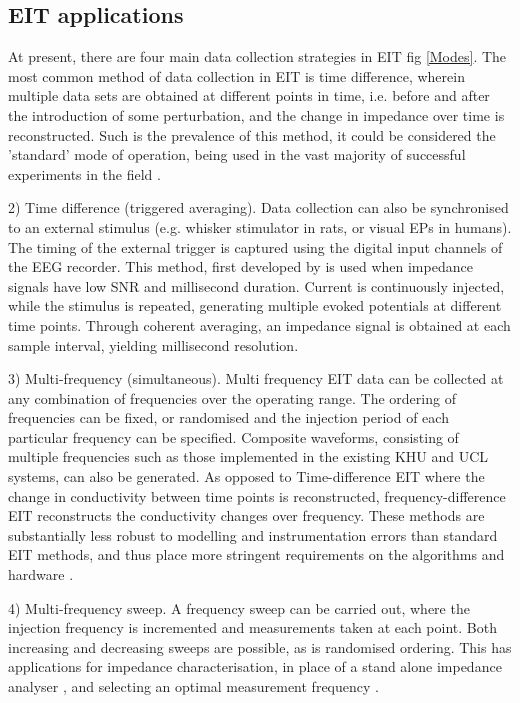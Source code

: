 \subsection{EIT applications}
At present, there are four main data collection strategies in EIT  fig \ref{Modes}.  The most common method of data collection in EIT is time difference, wherein multiple data sets are obtained at different points in time, i.e. before and after the introduction of some perturbation, and the change in impedance over time is reconstructed. Such is the prevalence of this method, it could be considered the 'standard' mode of operation, being used in the vast majority of successful experiments in the field \cite{bayford2012bioimpedance}.

2) Time difference (triggered averaging).  Data collection can also be synchronised to an external stimulus (e.g. whisker stimulator in rats, or visual EPs in humans). The timing of the external trigger is captured using the digital input channels of the EEG recorder. This method, first developed by \cite{Oh2011} is used when impedance signals have low SNR and millisecond duration. Current is continuously injected, while the stimulus is repeated, generating multiple evoked potentials at different time points. Through coherent averaging, an impedance signal is obtained at each sample interval, yielding millisecond resolution. 

3) Multi-frequency (simultaneous). Multi frequency EIT data can be collected at any combination of frequencies over the operating range. The ordering of frequencies can be fixed, or randomised and the injection period of each particular frequency can be specified. Composite waveforms, consisting of multiple frequencies such as those implemented in the existing KHU \cite{Hun_Wi_2014} and UCL \cite{McEwan_2006} systems, can also be generated. As opposed to Time-difference EIT where the change in conductivity between time points is reconstructed, frequency-difference EIT reconstructs the conductivity changes over frequency. These methods are substantially less robust to modelling and instrumentation errors than standard EIT methods, and thus place more stringent requirements on the algorithms and hardware \cite{Ahn2011} \cite{Malone2014}.

4) Multi-frequency sweep. A frequency sweep can be carried out, where the injection frequency is incremented and measurements taken at each point. Both increasing and decreasing sweeps are possible, as is randomised ordering. This has applications for impedance characterisation, in place of a stand alone impedance analyser \cite{Gabriel_2009}, and selecting an optimal measurement frequency \cite{VongerichtenASantosGAristovichK2013}.